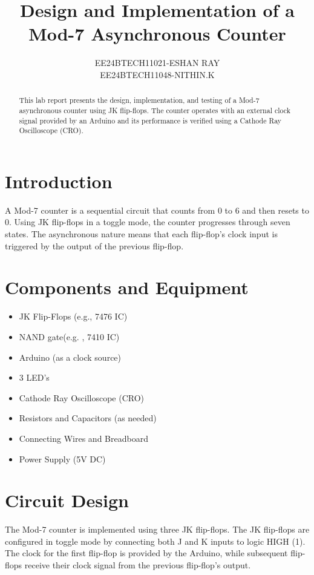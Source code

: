 \documentclass[a4paper,12pt]{article}
\title{\textbf{Design and Implementation of a Mod-7 Asynchronous Counter}}
\author{EE24BTECH11021-ESHAN RAY\\ EE24BTECH11048-NITHIN.K}
\begin{document}
\maketitle

\begin{abstract}
This lab report presents the design, implementation, and testing of a Mod-7 asynchronous counter using JK flip-flops. The counter operates with an external clock signal provided by an Arduino and its performance is verified using a Cathode Ray Oscilloscope (CRO).
\end{abstract}

\section{Introduction}
A Mod-7 counter is a sequential circuit that counts from 0 to 6 and then resets to 0. Using JK flip-flops in a toggle mode, the counter progresses through seven states. The asynchronous nature means that each flip-flop's clock input is triggered by the output of the previous flip-flop.

\section{Components and Equipment}
\begin{itemize}
    \item JK Flip-Flops (e.g., 7476 IC)
    \item NAND gate(e.g. , 7410 IC)
    \item Arduino (as a clock source)
    \item 3 LED's
    \item Cathode Ray Oscilloscope (CRO)
    \item Resistors and Capacitors (as needed)
    \item Connecting Wires and Breadboard
    \item Power Supply (5V DC)
\end{itemize}

\section{Circuit Design}
The Mod-7 counter is implemented using three JK flip-flops. The JK flip-flops are configured in toggle mode by connecting both J and K inputs to logic HIGH (1). The clock for the first flip-flop is provided by the Arduino, while subsequent flip-flops receive their clock signal from the previous flip-flop's output.
\end{document}
